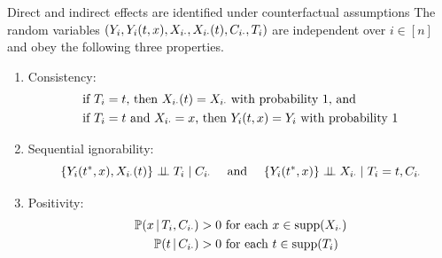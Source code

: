 \documentclass[aspectratio=169]{beamer}
\theoremstyle{remark}
\begin{document}
\begin{frame}{Direct and indirect effects are identified under counterfactual assumptions}
    The random variables $(Y_i, Y_i(t, x), X_{i \cdot}, X_{i \cdot}(t), C_{i \cdot}, T_i)$ are independent over $i \in [n]$ and obey the following three properties.
    \begin{enumerate}
        \item Consistency: \vspace{-3mm}
              \begin{equation*} \begin{aligned}
                       & \text{if $T_i = t$, then $\X_{i \cdot}(t) = \X_{i \cdot}$ with probability 1, and}    \\
                       & \text{if $T_i = t$ and $\X_{i \cdot} = x$, then $Y_i(t, x) = Y_i$ with probability 1}
                      \vspace{-2mm}
                  \end{aligned} \end{equation*}
        \item Sequential ignorability:
              \begin{equation*}
                  \{Y_i(t^*, x), X_{i \cdot}(t)\} \perp \!\!\! \perp T_i \mid C_{i \cdot}
                  ~~~\text{ and }~~~
                  \{Y_i(t^*, x)\} \perp \!\!\! \perp X_{i \cdot}  \mid T_i = t, C_{i \cdot}
              \end{equation*}
        \item Positivity:
              \begin{equation*}
                  \begin{aligned}
                      \P[T_i, \C_{i \cdot}]{x} & > 0 \text{ for each }  x \in \supp(\X_{i \cdot}) \\
                      \P[\C_{i \cdot}]{t}      & > 0 \text{ for each }  t \in \supp(T_i)
                  \end{aligned}
              \end{equation*}
    \end{enumerate}
\end{frame}
\end{document}
